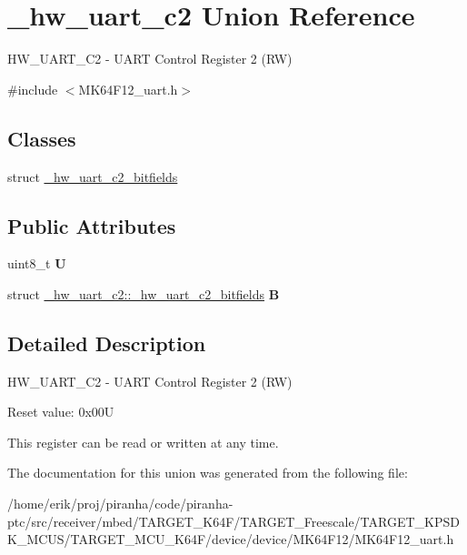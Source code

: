 \hypertarget{union__hw__uart__c2}{}\section{\+\_\+hw\+\_\+uart\+\_\+c2 Union Reference}
\label{union__hw__uart__c2}


H\+W\+\_\+\+U\+A\+R\+T\+\_\+\+C2 -\/ U\+A\+RT Control Register 2 (RW)  




{\ttfamily \#include $<$M\+K64\+F12\+\_\+uart.\+h$>$}

\subsection*{Classes}
\begin{DoxyCompactItemize}
\item 
struct \hyperlink{struct__hw__uart__c2_1_1__hw__uart__c2__bitfields}{\+\_\+hw\+\_\+uart\+\_\+c2\+\_\+bitfields}
\end{DoxyCompactItemize}
\subsection*{Public Attributes}
\begin{DoxyCompactItemize}
\item 
uint8\+\_\+t {\bfseries U}\hypertarget{union__hw__uart__c2_a94436f00ae0f0a4e7ae7ec5363be9438}{}\label{union__hw__uart__c2_a94436f00ae0f0a4e7ae7ec5363be9438}

\item 
struct \hyperlink{struct__hw__uart__c2_1_1__hw__uart__c2__bitfields}{\+\_\+hw\+\_\+uart\+\_\+c2\+::\+\_\+hw\+\_\+uart\+\_\+c2\+\_\+bitfields} {\bfseries B}\hypertarget{union__hw__uart__c2_a68b3e7427862cbf3b37a599b68fdb071}{}\label{union__hw__uart__c2_a68b3e7427862cbf3b37a599b68fdb071}

\end{DoxyCompactItemize}


\subsection{Detailed Description}
H\+W\+\_\+\+U\+A\+R\+T\+\_\+\+C2 -\/ U\+A\+RT Control Register 2 (RW) 

Reset value\+: 0x00U

This register can be read or written at any time. 

The documentation for this union was generated from the following file\+:\begin{DoxyCompactItemize}
\item 
/home/erik/proj/piranha/code/piranha-\/ptc/src/receiver/mbed/\+T\+A\+R\+G\+E\+T\+\_\+\+K64\+F/\+T\+A\+R\+G\+E\+T\+\_\+\+Freescale/\+T\+A\+R\+G\+E\+T\+\_\+\+K\+P\+S\+D\+K\+\_\+\+M\+C\+U\+S/\+T\+A\+R\+G\+E\+T\+\_\+\+M\+C\+U\+\_\+\+K64\+F/device/device/\+M\+K64\+F12/M\+K64\+F12\+\_\+uart.\+h\end{DoxyCompactItemize}
